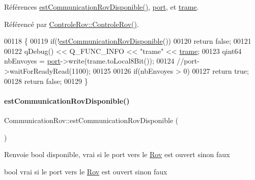 Références \hyperlink{class_communication_rov_a513c26b04745fa2ae31b4533d656dfd4}{est\+Communication\+Rov\+Disponible()}, \hyperlink{class_communication_rov_a21b62067ef0b2a6aec339df60b4abd72}{port}, et \hyperlink{class_communication_rov_a7100b1be33860d235b45efd9010ac218}{trame}.



Référencé par \hyperlink{class_controle_rov_acc4d5fea26770217df978d43df2ad51e}{Controle\+Rov\+::\+Controle\+Rov()}.


\begin{DoxyCode}
00118 \{
00119     \textcolor{keywordflow}{if}(!\hyperlink{class_communication_rov_a513c26b04745fa2ae31b4533d656dfd4}{estCommunicationRovDisponible}())
00120         \textcolor{keywordflow}{return} \textcolor{keyword}{false};
00121 
00122     qDebug() << Q\_FUNC\_INFO << \textcolor{stringliteral}{"trame"} << \hyperlink{class_communication_rov_a7100b1be33860d235b45efd9010ac218}{trame};
00123     qint64 nbEnvoyes = \hyperlink{class_communication_rov_a21b62067ef0b2a6aec339df60b4abd72}{port}->write(trame.toLocal8Bit());
00124     \textcolor{comment}{//port->waitForReadyRead(1100);}
00125 
00126     \textcolor{keywordflow}{if}(nbEnvoyes > 0)
00127         \textcolor{keywordflow}{return} \textcolor{keyword}{true};
00128     \textcolor{keywordflow}{return} \textcolor{keyword}{false};
00129 \}
\end{DoxyCode}
\mbox{\label{class_communication_rov_a513c26b04745fa2ae31b4533d656dfd4}} 
\paragraph{\texorpdfstring{est\+Communication\+Rov\+Disponible()}{estCommunicationRovDisponible()}}
{\footnotesize\ttfamily Communication\+Rov\+::est\+Communication\+Rov\+Disponible (\begin{DoxyParamCaption}{ }\end{DoxyParamCaption})}

\begin{DoxyReturn}{Renvoie}
bool disponible, vrai si le port vers le \hyperlink{class_rov}{Rov} est ouvert sinon faux

bool vrai si le port vers le \hyperlink{class_rov}{Rov} est ouvert sinon faux 
\end{DoxyReturn}


